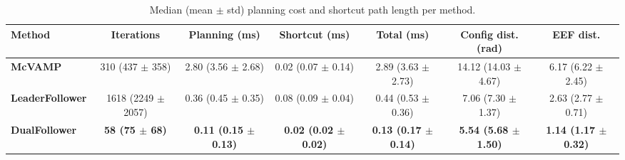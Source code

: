 \begin{table}[!t]
\centering
\scriptsize
\vspace{0.2em}
\begin{tabular}{lcccccc}                                                                                                               \toprule
Method & Iterations & Planning (ms) & Shortcut (ms) & Total (ms) & Config dist. (rad) & EEF dist. \\       
\midrule
\textbf{\textcolor[HTML]{66C2A5}{McVAMP}} & 310 (437 $\pm$ 358) & 2.80 (3.56 $\pm$ 2.68) & 0.02 (0.07 $\pm$ 0.14) & 2.89 (3.63 $\pm$ 2.73) & 14.12 (14.03 $\pm$ 4.67) & 6.17 (6.22 $\pm$ 2.45) \\
\textbf{\textcolor[HTML]{FC8D62}{LeaderFollower}} & 1618 (2249 $\pm$ 2057) & 0.36 (0.45 $\pm$ 0.35) & 0.08 (0.09 $\pm$ 0.04) & 0.44 (0.53 $\pm$ 0.36) & 7.06 (7.30 $\pm$ 1.37) & 2.63 (2.77 $\pm$ 0.71) \\
\textbf{\textcolor[HTML]{8DA0CB}{DualFollower}} & \textbf{58 (75 $\pm$ 68)} & \textbf{0.11 (0.15 $\pm$ 0.13)} & \textbf{0.02 (0.02 $\pm$ 0.02)} & \textbf{0.13 (0.17 $\pm$ 0.14)} & \textbf{5.54 (5.68 $\pm$ 1.50)} & \textbf{1.14 (1.17 $\pm$ 0.32)} \\
\bottomrule
\end{tabular}
\caption{Median (mean $\pm$ std) planning cost and shortcut path length per method.}
\label{tab:bimanual_results_tab}
\end{table}
